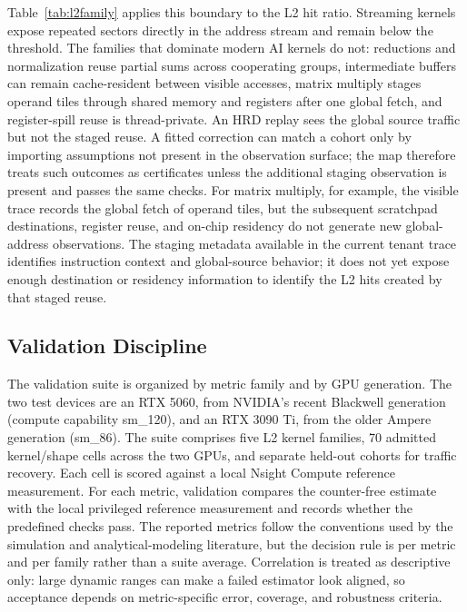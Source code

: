 \documentclass[conference]{IEEEtran}
\begin{document}
Table~\ref{tab:l2family} applies this boundary to the L2 hit ratio. Streaming
kernels expose repeated sectors directly in the address stream and remain below
the threshold. The families that dominate modern AI kernels do not: reductions
and normalization reuse partial sums across cooperating groups, intermediate
buffers can remain cache-resident between visible accesses, matrix multiply
stages operand tiles through shared memory and registers after one global fetch,
and register-spill reuse is thread-private. An HRD replay sees the global source
traffic but not the staged reuse. A fitted correction can match a cohort only by
importing assumptions not present in the observation surface; the map therefore
treats such outcomes as certificates unless the additional staging observation
is present and passes the same checks. For matrix multiply, for example, the
visible trace records the global fetch of operand tiles, but the subsequent
scratchpad destinations, register reuse, and on-chip residency do not generate
new global-address observations. The staging metadata available in the current
tenant trace identifies instruction context and global-source behavior; it does
not yet expose enough destination or residency information to identify the L2
hits created by that staged reuse.

\subsection{Validation Discipline}
\label{sec:microbench}

The validation suite is organized by metric family and by GPU generation. The
two test devices are an RTX 5060, from NVIDIA's recent Blackwell generation
(compute capability sm\_120), and an RTX 3090 Ti, from the older Ampere
generation (sm\_86). The suite comprises five L2 kernel families, 70 admitted
kernel/shape cells across the two GPUs, and separate held-out cohorts for
traffic recovery. Each cell is scored against a local
Nsight Compute reference measurement. For each metric, validation compares the
counter-free estimate with the local privileged reference measurement and
records whether the predefined checks pass. The reported metrics follow the
conventions used by the
simulation and analytical-modeling literature, but the decision rule is per
metric and per family rather than a suite average. Correlation is treated as
descriptive only: large dynamic ranges can make a failed estimator look
aligned, so acceptance depends on metric-specific error, coverage, and
robustness criteria.
\end{document}
